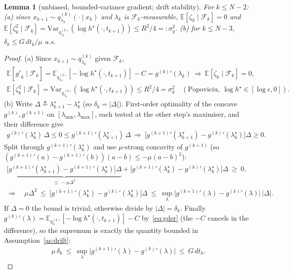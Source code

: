 \documentclass[11pt]{article}
\newcommand{\E}{\mathbb{E}}
\newcommand{\Var}{\mathrm{Var}}
\newcommand{\F}{\mathcal{F}}
\newcommand{\hs}{h^\star}
\newcommand{\lmin}{\lambda_{\min}}
\newcommand{\lmax}{\lambda_{\max}}
\theoremstyle{plain}
\newtheorem{lemma}{Lemma}
\theoremstyle{definition}
\theoremstyle{remark}
\begin{document}
\begin{lemma}[unbiased, bounded-variance gradient; drift stability]
\label{lem:noise}
For $k\le N-2$: \textup{(a)} since $x_{k+1}\sim q^{(k)}_{\lambda_k}(\cdot\mid x_k)$ and $\lambda_k$
is $\F_k$-measurable, $\E[\zeta_k\mid\F_k]=0$ and $\E[\zeta_k^2\mid\F_k]
=\Var_{q^{(k)}_{\lambda_k}}(\log\hs(\cdot,t_{k+1}))\le R^2/4=:\sigma_g^2$. \textup{(b)} for $k\le N-3$,
$\delta_k\le G\,dt_k/\mu$ a.s.
\end{lemma}
\begin{proof}
\textup{(a)} Since $x_{k+1}\sim q^{(k)}_{\lambda_k}$ given $\F_k$,
\begin{gather*}
\E[\widehat{g'}_k\mid\F_k]=\E_{q^{(k)}_{\lambda_k}}[-\log\hs(\cdot,t_{k+1})]-C=g^{(k)}{}'(\lambda_k)
\ \Rightarrow\ \E[\zeta_k\mid\F_k]=0,\\
\E[\zeta_k^2\mid\F_k]=\Var_{q^{(k)}_{\lambda_k}}(\log\hs(\cdot,t_{k+1}))\le R^2/4=\sigma_g^2\quad(\text{Popoviciu},\ \log\hs\in[\log\epsilon,0]).
\end{gather*}
\textup{(b)} Write $\Delta\triangleq\lambda^\star_{k+1}-\lambda^\star_k$ (so $\delta_k=|\Delta|$). First-order optimality of the concave $g^{(k)},g^{(k+1)}$ on $[\lmin,\lmax]$, each tested at the other step's maximiser, and their difference give
\begin{gather*}
g^{(k)}{}'(\lambda^\star_k)\,\Delta\le0\le g^{(k+1)}{}'(\lambda^\star_{k+1})\,\Delta
\ \Longrightarrow\ \big[g^{(k+1)}{}'(\lambda^\star_{k+1})-g^{(k)}{}'(\lambda^\star_k)\big]\Delta\ge0.
\end{gather*}
Split through $g^{(k+1)}{}'(\lambda^\star_k)$ and use $\mu$-strong concavity of $g^{(k+1)}$ (so $(g^{(k+1)}{}'(a)-g^{(k+1)}{}'(b))(a-b)\le-\mu(a-b)^2$):
\begin{gather*}
\underbrace{\big[g^{(k+1)}{}'(\lambda^\star_{k+1})-g^{(k+1)}{}'(\lambda^\star_k)\big]\Delta}_{\le\,-\mu\Delta^2}
+\big[g^{(k+1)}{}'(\lambda^\star_k)-g^{(k)}{}'(\lambda^\star_k)\big]\Delta\ \ge\ 0,\\
\Longrightarrow\quad
\mu\Delta^2\ \le\ \big[g^{(k+1)}{}'(\lambda^\star_k)-g^{(k)}{}'(\lambda^\star_k)\big]\Delta
\ \le\ \sup_{\lambda}\big|g^{(k+1)}{}'(\lambda)-g^{(k)}{}'(\lambda)\big|\,|\Delta|.
\end{gather*}
If $\Delta=0$ the bound is trivial; otherwise divide by $|\Delta|=\delta_k$. Finally
$g^{(k)}{}'(\lambda)=\E_{q^{(k)}_\lambda}[-\log\hs(\cdot,t_{k+1})]-C$ by~\eqref{eq:gder} (the $-C$ cancels in the difference), so the supremum is exactly the quantity bounded in Assumption~\ref{as:drift}:
\begin{gather*}
\mu\,\delta_k\ \le\ \sup_{\lambda}\big|g^{(k+1)}{}'(\lambda)-g^{(k)}{}'(\lambda)\big|\ \le\ G\,dt_k.
\end{gather*}
\end{proof}
\end{document}
